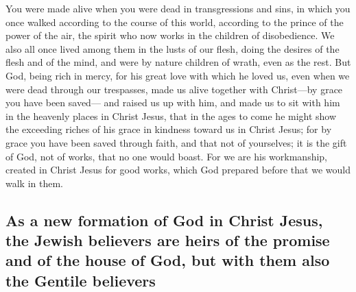  You were made alive when you were dead in transgressions
and sins,  in which you once walked according to the
course of this world, according to the prince of the power of the air,
the spirit who now works in the children of disobedience. 
We also all once lived among them in the lusts of our flesh, doing the
desires of the flesh and of the mind, and were by nature children of
wrath, even as the rest.  But God, being rich in mercy,
for his great love with which he loved us,  even when we
were dead through our trespasses, made us alive together with
Christ---by grace you have been saved---  and raised us up
with him, and made us to sit with him in the heavenly places in Christ
Jesus,  that in the ages to come he might show the
exceeding riches of his grace in kindness toward us in Christ Jesus;
 for by grace you have been saved through faith, and that
not of yourselves; it is the gift of God,  not of works,
that no one would boast.  For we are his workmanship,
created in Christ Jesus for good works, which God prepared before that
we would walk in them.

\hypertarget{as-a-new-formation-of-god-in-christ-jesus-the-jewish-believers-are-heirs-of-the-promise-and-of-the-house-of-god-but-with-them-also-the-gentile-believers}{%
\subsection{As a new formation of God in Christ Jesus, the Jewish
believers are heirs of the promise and of the house of God, but with
them also the Gentile
believers}\label{as-a-new-formation-of-god-in-christ-jesus-the-jewish-believers-are-heirs-of-the-promise-and-of-the-house-of-god-but-with-them-also-the-gentile-believers}}

